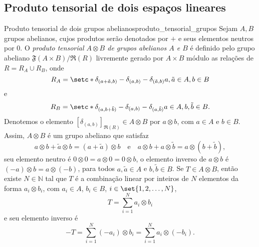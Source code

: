 \subsection{Produto tensorial de dois espaços lineares}

\begin{proposition}{Produto tensorial de dois grupos abelianos}{produto_tensorial_grupos}
    Sejam \(A, B\) grupos abelianos, cujos produtos serão denotados por \(+\) e seus elementos neutros por \(0\). O \emph{produto tensorial \(A \otimes B\) de grupos abelianos \(A\) e \(B\)} é definido pelo grupo abeliano \(\mathfrak{F}(A \times B)/\mathfrak{R}(R)\) livremente gerado por \(A \times B\) módulo as relações de \(R = R_A \cup R_B\), onde
    \begin{equation*}
        R_A = \setc*{\delta_{(a + \tilde{a}, b)} - \delta_{(a,b)} - \delta_{(\tilde{a},b)}}{a, \tilde{a} \in A, b \in B}
    \end{equation*}
    e
    \begin{equation*}
        R_B = \setc*{\delta_{(a,b + \tilde{b})} - \delta_{(a,b)} - \delta_{(a,\tilde{b})}}{a \in A, b, \tilde{b} \in B}.
    \end{equation*}
    Denotemos o elemento \([\delta_{(a,b)}]_{\mathfrak{R}(R)} \in A \otimes B\) por \(a \otimes b\), com \(a\in A\) e \(b \in B\). Assim, \(A \otimes B\) é um grupo abeliano que satisfaz
    \begin{equation*}
        a \otimes b + \tilde{a} \otimes b = (a + \tilde{a}) \otimes b\quad\text{e}\quad
        a \otimes b + a \otimes \tilde{b} = a \otimes (b + \tilde{b}),
    \end{equation*}
    seu elemento neutro é \(0 \otimes 0 = a \otimes 0 = 0 \otimes b\), o elemento inverso de \(a \otimes b\) é \((-a) \otimes b = a \otimes (-b)\), para todos \(a,\tilde{a} \in A\) e \(b,\tilde{b} \in B\). Se \(T \in A \otimes B\), então existe \(N \in \mathbb{N}\) tal que \(T\) é a combinação linear por inteiros de \(N\) elementos da forma \(a_i \otimes b_i\), com \(a_i \in A\), \(b_i \in B\), \(i \in \set{1, 2,\dots, N}\),
    \begin{equation*}
        T = \sum_{i = 1}^N a_i \otimes b_i
    \end{equation*}
    e seu elemento inverso é
    \begin{equation*}
        -T = \sum_{i = 1}^N (-a_i) \otimes b_i = \sum_{i = 1}^N a_i \otimes (-b_i).
    \end{equation*}
\end{proposition}
